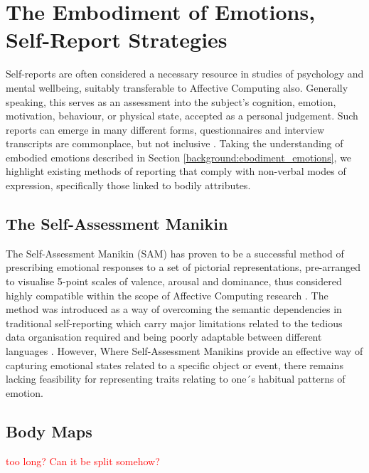 \section{The Embodiment of Emotions, Self-Report Strategies}

Self-reports are often considered a necessary resource in studies of psychology and mental wellbeing, suitably transferable to Affective Computing also. Generally speaking, this serves as an assessment into the subject's cognition, emotion, motivation, behaviour, or physical state, accepted as a personal judgement. Such reports can emerge in many different forms, questionnaires and interview transcripts are commonplace, but not inclusive \cite{barker_self-report_2016}. Taking the understanding of embodied emotions described in Section \ref{background:ebodiment_emotions}, we highlight existing methods of reporting that comply with non-verbal modes of expression, specifically those linked to bodily attributes.

\subsection{The Self-Assessment Manikin}

The Self-Assessment Manikin (SAM) has proven to be a successful method of prescribing emotional responses to a set of pictorial representations, pre-arranged to visualise 5-point scales of valence, arousal and dominance, thus considered highly compatible within the scope of Affective Computing research \cite{zeigler-hill_self-assessment_2017}. The method was introduced as a way of overcoming the semantic dependencies in traditional self-reporting which carry major limitations related to the tedious data organisation required and being poorly adaptable between different languages \cite{zeigler-hill_self-assessment_2017}. However, Where Self-Assessment Manikins provide an effective way of capturing emotional states related to a specific object or event, there remains lacking feasibility for representing traits relating to one´s habitual patterns of emotion.

\subsection{Body Maps}
\textcolor{red}{too long? Can it be split somehow?}

